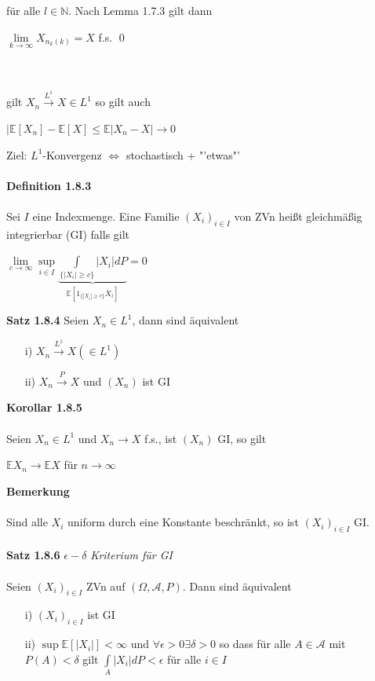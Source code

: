 \documentclass[10pt,a4paper]{report}
\newcommand{\E}{\mathbb{E}}
\newcommand{\N}{\mathbb{N}}
\numberwithin{equation}{section}
\numberwithin{figure}{section}
\theoremstyle{plain}
\theoremstyle{definition}
\theoremstyle{plain}
\theoremstyle{definition}
\theoremstyle{remark}
\theoremstyle{plain}
\theoremstyle{plain}
\theoremstyle{plain}
\newcommand{\1}{ \mathbb{1} } %
\begin{document}
für alle $l \in \N$. Nach Lemma 1.7.3 gilt dann 
\begin{center}
$\lim\limits_{k \to \infty} X_{n_k(k)}=X$ f.s. \qed
\end{center}
$ $\\\\
gilt $X_n\overset{L^1}{\to} X \in L^1$ so gilt auch
\begin{center}
$|\E[X_n]-\E[X] \leq \E|X_n-X| \to 0$
\end{center}
Ziel: $L^1$-Konvergenz $\Leftrightarrow$ stochastisch + "'etwas"'\\\\
\textbf{Definition 1.8.3}\\\\
Sei $I$ eine Indexmenge. Eine Familie $(X_i)_{i \in I}$ von ZVn heißt gleichmäßig integrierbar (GI) falls gilt
\begin{center}
$\lim\limits_{c \to \infty} \sup\limits_{i \in I} \underbrace{\int\limits_{\{|X_i|\geq c\}}|X_i|dP}_{\E[1_{\{|X_i|\geq c\}}X_i]}=0 $
\end{center}
\textbf{Satz 1.8.4} Seien $X_n \in L^1$, dann sind äquivalent
\begin{itemize}
\item[i)] $X_n \overset{L^1}{\to} X (\in L^1)$
\item[ii)] $X_n \overset{P}{\to} X$ und $(X_n)$ ist GI
\end{itemize}
\textbf{Korollar 1.8.5}\\\\
Seien $X_n \in L^1$ und $X_n \to X$ f.s., ist $(X_n)$ GI, so gilt
\begin{center}
$\E X_n \to \E X$ für $n \to \infty$
\end{center} 
\textbf{Bemerkung}\\\\
Sind alle $X_i$ uniform durch eine Konstante beschränkt, so ist $(X_i)_{i \in I}$ GI.\\\\
\textbf{Satz 1.8.6} \textit{$\epsilon - \delta$ Kriterium für GI}\\\\
Seien $(X_i)_{i \in I}$ ZVn auf $(\Omega, \mathcal{A},P)$. Dann sind äquivalent
\begin{itemize}
\item[i)] $(X_i)_{i \in I}$ ist GI
\item[ii)] $\sup \E [|X_i|]< \infty$ und $\forall \epsilon > 0 \exists \delta >0$ so dass für alle $A \in \mathcal{A}$ mit $P(A)< \delta$ gilt $\int\limits_A |X_i|dP<\epsilon$ für alle $i \in I$
\end{itemize}
\end{document}
